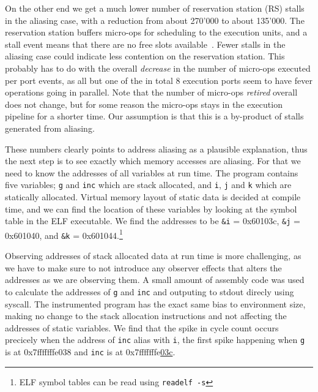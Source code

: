 \documentclass[a4paper,10pt,twocolumn,twoside]{article}
\begin{document}
On the other end we get a much lower number of reservation station (RS) stalls in the aliasing case, with a reduction from about 270'000 to about 135'000.
The reservation station buffers micro-ops for scheduling to the execution units, and a stall event means that there are no free slots available~\cite[Table 19-2]{Intel:2013:Volume3B}.
Fewer stalls in the aliasing case could indicate less contention on the reservation station.
This probably has to do with the overall \emph{decrease} in the number of micro-ops executed per port events, as all but one of the in total 8 execution ports seem to have fever operations going in parallel.
Note that the number of micro-ops \emph{retired} overall does not change, but for some reason the micro-ops stays in the execution pipeline for a shorter time.
Our assumption is that this is a by-product of stalls generated from aliasing.

These numbers clearly points to address aliasing as a plausible explanation, thus the next step is to see exactly which memory accesses are aliasing. 
For that we need to know the addresses of all variables at run time.
The program contains five variables; \texttt{g} and \texttt{inc} which are stack allocated, and \texttt{i}, \texttt{j} and \texttt{k} which are statically allocated.
Virtual memory layout of static data is decided at compile time, and we can find the location of these variables by looking at the symbol table in the ELF executable.
We find the addresses to be \texttt{\&i} = 0x60103c, \texttt{\&j} = 0x601040, and \texttt{\&k} = 0x601044.\footnote{ELF symbol tables can be read using \texttt{readelf -s}}

Observing addresses of stack allocated data at run time is more challenging, as we have to make sure to not introduce any observer effects that alters the addresses as we are observing them.
A small amount of assembly code was used to calculate the addresses of \texttt{g} and \texttt{inc} and outputing to stdout direcly using syscall.
The instrumented program has the exact same bias to environment size, making no change to the stack allocation instructions and not affecting the addresses of static variables.
We find that the spike in cycle count occurs precicely when the address of \texttt{inc} alias with \texttt{i}, the first spike happening when \texttt{g} is at 0x7fffffffe038 and \texttt{inc} is at 0x7fffffffe{\underline{03c}}.
\end{document}
